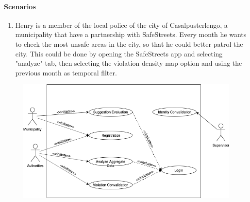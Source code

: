 \paragraph{Scenarios}
\begin{enumerate}
    \item Henry is a member of the local police of the city of Casalpusterlengo, a municipality that have a partnership with SafeStreets. Every month he wants to check the most unsafe areas in the city, so that he could better patrol the city. This could be done by opening the SafeStreets app and selecting "analyze" tab, then selecting the violation density map option and using the previous month as temporal filter.
\end{enumerate}

\begin{figure}[htbp]
        \centering
        \includegraphics[width=\textwidth]{Images/UseCaseThirdParty}
\end{figure}